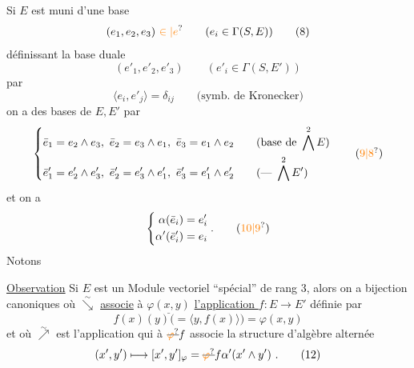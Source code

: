 Si $E$ est muni d'une base
\[
 (e_1,e_2,e_3)\ \unsure{\in|e}\qquad (e_i\in\Gamma(S,E)) \tag*{(8)}
\]
définissant la base duale
\[
 (e'_1,e'_2,e'_3)\qquad(e'_i\in\Gamma(S,E')) \tag*{(8$'$)}
\]
par
\[
 \langle e_i,e'_j\rangle=\delta_{ij}\qquad\text{(symb. de Kronecker)}
\]
on a des bases de $E,E'$ par
\[
\left\{\begin{aligned}
 \bar e_1=e_2\wedge e_3,\ \bar e_2=e_3\wedge e_1,\ \bar e_3=e_1\wedge e_2
 &\qquad(\text{base de }\bigwedge^2 E)\\
 \bar e'_1=e'_2\wedge e'_3,\ \bar e'_2=e'_3\wedge e'_1,\ \bar e'_3=e'_1\wedge e'_2
 &\qquad(\text{--- }\bigwedge^2 E')
\end{aligned}\right. \tag*{(\unsure{9|8})}
\]
et on a
\[
 \left\{\begin{aligned}
 \alpha(\bar e_i)&=e'_i\\
 \alpha'(\bar e'_i)&=e_i
 \end{aligned}\right. . \tag*{(\unsure{10|9})}
\]
Notons 

\uline{Observation} Si $E$ est un Module vectoriel ``spécial'' de rang 3, alors on a  bijection canoniques
où $\overset{\sim}{\searrow}$ \uline{associe} à $\underline{\varphi(x,y)}$ \uline{l'application $f$}$:E\to E'$ définie par
\[
 f(x)(y)\bigl(=\langle y,f(x)\rangle\bigr)=\varphi(x,y) \tag*{(11)}
\]
et où $\overset{\sim}{\nearrow}$ est l'application qui à $\deleted{\unsure{\varphi}}f$ associe la structure d'algèbre alternée
\[
 (x',y')\longmapsto [x',y']_\varphi=\deleted{\unsure{\varphi}}f\alpha'(x'\wedge y')\ . \tag*{(12)}
\]

